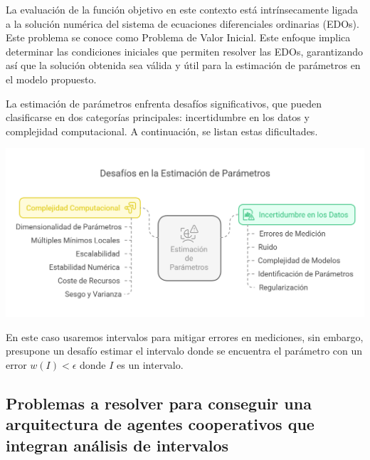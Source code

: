 \documentclass{article}
\begin{document}
    La evaluación de la función objetivo en este contexto está intrínsecamente ligada a la solución numérica del sistema de ecuaciones diferenciales ordinarias (EDOs). Este problema se conoce como Problema de Valor Inicial. Este enfoque implica determinar las condiciones iniciales que permiten resolver las EDOs, garantizando así que la solución obtenida sea válida y útil para la estimación de parámetros en el modelo propuesto.

        La estimación de parámetros enfrenta desafíos significativos, que pueden clasificarse en dos categorías principales: incertidumbre en los datos y complejidad computacional. A continuación, se listan estas dificultades. \\


        \begin{center}
            \includegraphics[width=1\textwidth]{images/visual-selection.png}
    \end{center}

        En este caso usaremos intervalos para mitigar errores en mediciones, sin embargo, presupone un desafío estimar el intervalo donde se encuentra el parámetro con un error $w(I) < \epsilon$  donde $I$ es un intervalo.\\



        \subsection*{ Problemas a resolver para conseguir una arquitectura de agentes cooperativos que integran análisis de intervalos }
\end{document}
